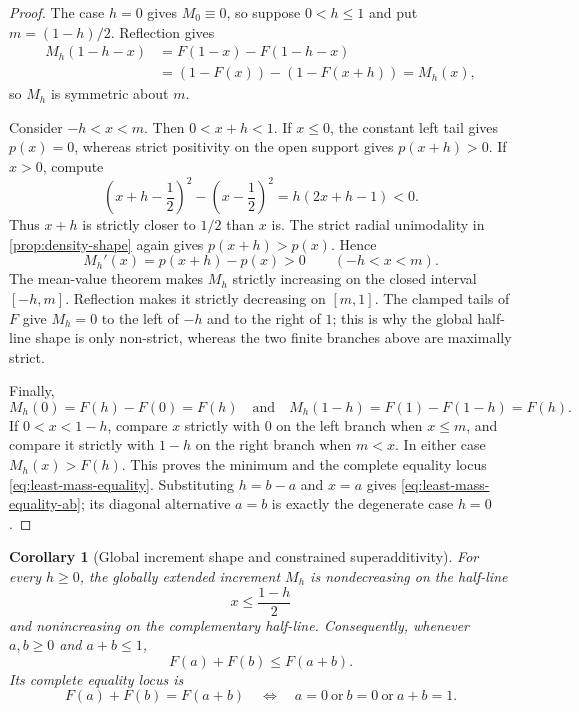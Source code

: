 \documentclass[11pt,oneside]{article}
\newtheorem{corollary}[theorem]{Corollary}
\theoremstyle{definition}
\theoremstyle{remark}
\numberwithin{equation}{section}
\begin{document}
\begin{proof}
The case $h=0$ gives $M_0\equiv0$, so suppose $0<h\le1$ and put
$m=(1-h)/2$.  Reflection gives
\begin{align*}
 M_h(1-h-x)
 &=F(1-x)-F(1-h-x)\\
 &=(1-F(x))-(1-F(x+h))=M_h(x),
\end{align*}
so $M_h$ is symmetric about $m$.

Consider $-h<x<m$.  Then $0<x+h<1$.  If $x\le0$, the constant left tail gives
$p(x)=0$, whereas strict positivity on the open support gives $p(x+h)>0$.
If $x>0$, compute
\begin{equation}\label{eq:distance-comparison}
 \left(x+h-\frac12\right)^2-
 \left(x-\frac12\right)^2
 =h(2x+h-1)<0.
\end{equation}
Thus $x+h$ is strictly closer to $1/2$ than $x$ is.  The strict radial
unimodality in \cref{prop:density-shape} again gives $p(x+h)>p(x)$.  Hence
\begin{equation}\label{eq:M-derivative}
 M_h'(x)=p(x+h)-p(x)>0
 \qquad(-h<x<m).
\end{equation}
The mean-value theorem makes $M_h$ strictly increasing on the closed interval
$[-h,m]$.  Reflection makes it strictly decreasing on $[m,1]$.  The clamped
tails of $F$ give $M_h=0$ to the left of $-h$ and to the right of $1$; this is
why the global half-line shape is only non-strict, whereas the two finite
branches above are maximally strict.

Finally,
\[
 M_h(0)=F(h)-F(0)=F(h)
 \quad\text{and}\quad
 M_h(1-h)=F(1)-F(1-h)=F(h).
\]
If $0<x<1-h$, compare $x$ strictly with $0$ on the left branch when $x\le m$,
and compare it strictly with $1-h$ on the right branch when $m<x$.  In either
case $M_h(x)>F(h)$.  This proves the minimum and the complete equality locus
\eqref{eq:least-mass-equality}.  Substituting $h=b-a$ and $x=a$ gives
\eqref{eq:least-mass-equality-ab}; its diagonal alternative $a=b$ is exactly
the degenerate case $h=0$.
\end{proof}

\begin{corollary}[Global increment shape and constrained superadditivity]
\label{cor:global-increment-shape}
For every $h\ge0$, the globally extended increment $M_h$ is nondecreasing on
the half-line
\[
 x\le\frac{1-h}{2}
\]
and nonincreasing on the complementary half-line.  Consequently, whenever
$a,b\ge0$ and $a+b\le1$,
\begin{equation}\label{eq:fabius-superadditive}
 F(a)+F(b)\le F(a+b).
\end{equation}
Its complete equality locus is
\begin{equation}\label{eq:fabius-superadditive-equality}
 F(a)+F(b)=F(a+b)
 \quad\Longleftrightarrow\quad
 a=0\ \text{or}\ b=0\ \text{or}\ a+b=1.
\end{equation}
\end{corollary}
\end{document}
